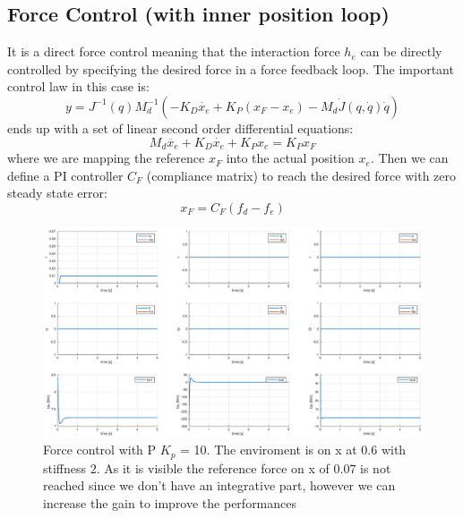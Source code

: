 \documentclass[a4paper,12pt]{article}
\begin{document}
\subsection{Force Control (with inner position loop)}
It is a direct force control meaning that the interaction force $h_e$ can be directly controlled by specifying the desired force in a force feedback loop. The important control law in this case is:
\[
    y = J^{-1}(q)M_d^{-1}\left(-K_D\dot{x_e} + K_P(x_F-x_e) - M_d\dot{J}(q,\dot{q})\dot{q}\right)
\]
ends up with a set of linear second order differential equations:
\[
    M_d\ddot{x_e} + K_D\dot{x_e} + K_Px_e = K_Px_F
\]
where we are mapping the reference $x_F$ into the actual position $x_e$. Then we can define a PI controller $C_F$ (compliance matrix) to reach the desired force with zero steady state error:
\[
    x_F = C_F(f_d - f_e)
\]
\begin{figure}[H]
    \begin{center}
        \hspace*{-4.5cm}
        \includegraphics[scale=0.5]{images/force_p.eps}
    \end{center}
    \caption{Force control with P $K_p$ = 10. The enviroment is on x at 0.6 with stiffness $2$. As it is visible the reference force on x of $0.07$ is not reached since we don't have an integrative part, however we can increase the gain to improve the performances}
    \label{fig:force_p}
\end{figure}
\end{document}
